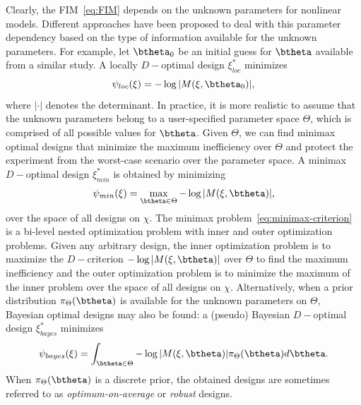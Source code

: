 Clearly, the FIM~\eqref{eq:FIM}  depends on the unknown parameters for nonlinear models.
Different  approaches have been proposed to deal with this parameter dependency
based on the type of information available for the unknown parameters. For example, let  $\btheta_0$ be an initial guess for $\btheta$ available from a similar study.
A locally $D-$optimal design $\xi^*_{loc}$  minimizes
\begin{equation}
\label{eq:locally-criterion}
\psi_{loc}(\xi) =   -\log|M(\xi, \btheta_0)|,
\end{equation}
where   $|\cdot|$ denotes  the determinant.  In practice, it is more realistic to assume that the unknown parameters belong to a user-specified parameter space $\Theta$, which  is comprised of all possible values  for $\btheta$. Given $\Theta$, we can find minimax optimal designs that minimize the maximum inefficiency over $\Theta$ and protect the experiment from the worst-case scenario over the parameter space.
A minimax $D-$optimal design $\xi^*_{min}$   is obtained by minimizing
\begin{equation}
\label{eq:minimax-criterion}
\psi_{min}(\xi) =  \max_{\btheta \in \Theta}  -\log|M(\xi, \btheta)|,
\end{equation}
over the space of all designs on $\chi$. The minimax problem~\eqref{eq:minimax-criterion} is a bi-level nested optimization problem with inner and outer optimization problems. Given any arbitrary design, the inner optimization problem is to maximize the $D-$criterion $-\log|M(\xi, \btheta)|$ over $\Theta$ to find the maximum inefficiency  and  the  outer  optimization problem is to  minimize the maximum of the inner problem over  the space of all designs on $\chi$. 
Alternatively,  when a prior distribution $\pi_{\Theta}(\btheta)$  is available for the unknown parameters on $\Theta$, Bayesian optimal designs may also be found: a (pseudo) Bayesian  $D-$optimal design $\xi_{bayes}^*$ minimizes
\begin{equation}
\label{eq:bayesian-criterion}
\psi_{bayes}(\xi) = \int_{\btheta \in \Theta}  -\log|M(\xi, \btheta)| \pi_{\Theta}(\btheta) d\btheta.
\end{equation}
When   $\pi_{\Theta}(\btheta)$ is a discrete prior, the obtained designs are sometimes referred to as  {\it optimum-on-average} or {\it robust}  designs.


